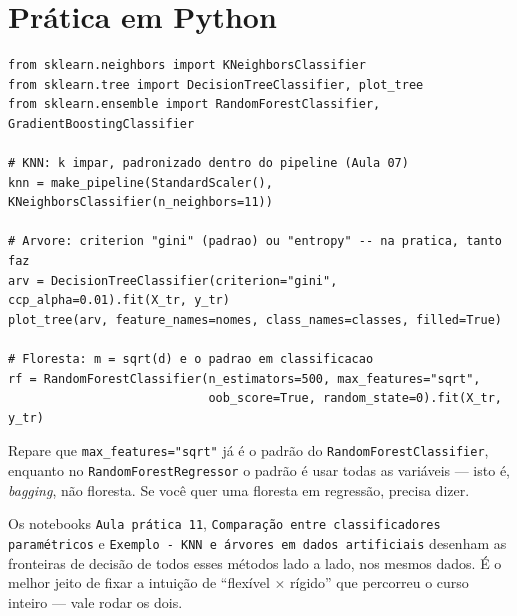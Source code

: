 \documentclass[11pt,a4paper]{article}
\begin{document}
\section{Prática em Python}
\begin{lstlisting}
from sklearn.neighbors import KNeighborsClassifier
from sklearn.tree import DecisionTreeClassifier, plot_tree
from sklearn.ensemble import RandomForestClassifier, GradientBoostingClassifier

# KNN: k impar, padronizado dentro do pipeline (Aula 07)
knn = make_pipeline(StandardScaler(), KNeighborsClassifier(n_neighbors=11))

# Arvore: criterion "gini" (padrao) ou "entropy" -- na pratica, tanto faz
arv = DecisionTreeClassifier(criterion="gini", ccp_alpha=0.01).fit(X_tr, y_tr)
plot_tree(arv, feature_names=nomes, class_names=classes, filled=True)

# Floresta: m = sqrt(d) e o padrao em classificacao
rf = RandomForestClassifier(n_estimators=500, max_features="sqrt",
                            oob_score=True, random_state=0).fit(X_tr, y_tr)
\end{lstlisting}
Repare que \texttt{max\_features="sqrt"} já é o padrão do
\texttt{RandomForestClassifier}, enquanto no \texttt{RandomForestRegressor} o padrão
é usar todas as variáveis --- isto é, \emph{bagging}, não floresta. Se você quer uma
floresta em regressão, precisa dizer.

Os notebooks \texttt{Aula prática 11}, \texttt{Comparação entre classificadores
paramétricos} e
\texttt{Exemplo - KNN e árvores em dados artificiais} desenham as fronteiras de
decisão de todos esses métodos lado a lado, nos mesmos dados. É o melhor jeito de
fixar a intuição de ``flexível $\times$ rígido'' que percorreu o curso inteiro ---
vale rodar os dois.

\end{document}
